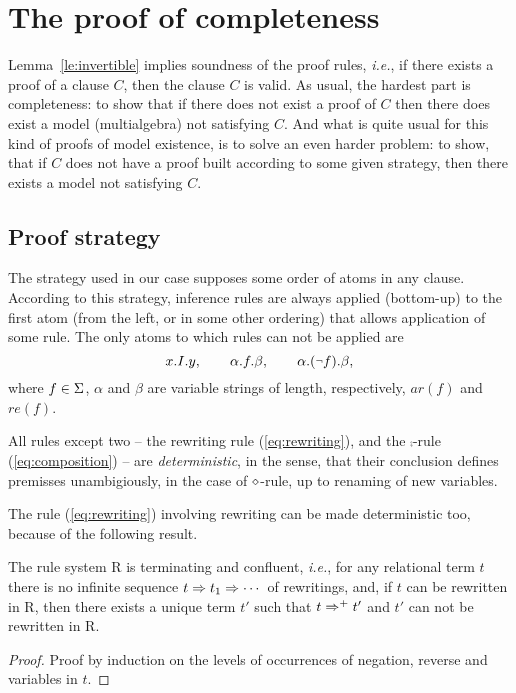 \appendix
\section{The proof of completeness}\label {app:proof}

Lemma~\ref{le:invertible} implies soundness of the proof rules, {\it i.e.},
if there exists a proof of a clause $C$, then the clause $C$ is valid.  
As usual, the hardest part is completeness: to show that if there
does not exist a proof of $C$ then there does exist a model (multialgebra)
not satisfying $C$.  And what is quite usual for this kind of proofs of
model existence, is to solve an even harder problem: to show, that if
$C$ does not have a proof built according to some given strategy, then there
exists a model not satisfying $C$.  

\subsection{Proof strategy}

The strategy used in our case supposes some order of atoms in any clause.
According to this strategy, inference rules are always applied (bottom-up) to
the first atom (from the left, or in some other ordering) 
that allows application of some rule. The only atoms to which
rules can not be applied are
\begin{equation}\label {eq:primitive}
x.I.y,\qquad \alpha.f.\beta,\qquad \alpha.(\Neg f).\beta,
\end{equation} 
where \(f\in\Sigma\), $\alpha$ and $\beta$ are variable strings of length,
respectively, $ar(f)$ and $re(f)$.  

All rules except two -- the rewriting rule (\ref{eq:rewriting}), and the 
$\comp$-rule (\ref{eq:composition}) -- are {\em
deterministic}, in the sense, that their conclusion defines premisses
unambigiously, in the case of $\diamond$-rule, up to renaming of new variables.


The rule (\ref{eq:rewriting}) involving rewriting can be made deterministic too,
 because of the following result.

\begin{lemma}\label {le:confluent}
The rule system \C R is terminating and confluent, {\it i.e.}, for any
relational term $t$ there is no infinite sequence \(t\Rightarrow
t_1\Rightarrow\cdots\) of rewritings, and, if $t$ can be rewritten in \C R,
then there exists a unique term $t'$ such that $t\Rightarrow^+ t'$ and $t'$ can not
be rewritten in \C R.
\end{lemma}
\begin{proof}
Proof by induction on the levels of occurrences of negation, reverse and
variables in $t$. 
\end{proof}

